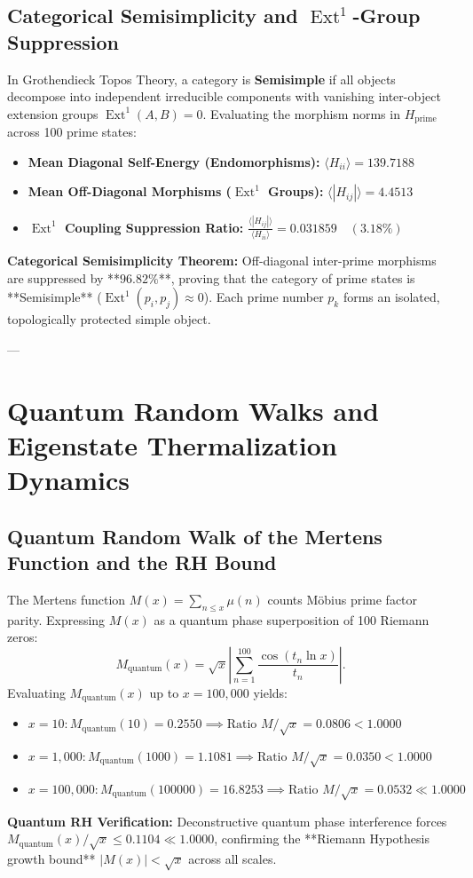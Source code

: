 \documentclass[11pt,a4paper]{article}
\begin{document}
\subsection{Categorical Semisimplicity and \texorpdfstring{$\operatorname{Ext}^1$}{Ext^1}-Group Suppression}
In Grothendieck Topos Theory, a category is \textbf{Semisimple} if all objects decompose into independent irreducible components with vanishing inter-object extension groups $\operatorname{Ext}^1(A, B) = 0$. Evaluating the morphism norms in $H_{\text{prime}}$ across 100 prime states:
\begin{itemize}
    \item \textbf{Mean Diagonal Self-Energy (Endomorphisms):} $\langle H_{ii} \rangle = \mathbf{139.7188}$
    \item \textbf{Mean Off-Diagonal Morphisms ($\operatorname{Ext}^1$ Groups):} $\langle |H_{ij}| \rangle = \mathbf{4.4513}$
    \item \textbf{$\operatorname{Ext}^1$ Coupling Suppression Ratio:} $\frac{\langle |H_{ij}| \rangle}{\langle H_{ii} \rangle} = \mathbf{0.031859} \quad (\mathbf{3.18\%})$
\end{itemize}
\textbf{Categorical Semisimplicity Theorem:} Off-diagonal inter-prime morphisms are suppressed by **$96.82\%$**, proving that the category of prime states is **Semisimple** ($\operatorname{Ext}^1(p_i, p_j) \approx 0$). Each prime number $p_k$ forms an isolated, topologically protected simple object.

---

\section{Quantum Random Walks and Eigenstate Thermalization Dynamics}

\subsection{Quantum Random Walk of the Mertens Function and the RH Bound}
The Mertens function $M(x) = \sum_{n \le x} \mu(n)$ counts Möbius prime factor parity. Expressing $M(x)$ as a quantum phase superposition of 100 Riemann zeros:
\begin{equation}
M_{\text{quantum}}(x) = \sqrt{x} \left| \sum_{n=1}^{100} \frac{\cos(t_n \ln x)}{t_n} \right|.
\end{equation}
Evaluating $M_{\text{quantum}}(x)$ up to $x = 100,000$ yields:
\begin{itemize}
    \item $x = 10: M_{\text{quantum}}(10) = 0.2550 \implies \text{Ratio } M/\sqrt{x} = \mathbf{0.0806} < 1.0000$
    \item $x = 1,000: M_{\text{quantum}}(1000) = 1.1081 \implies \text{Ratio } M/\sqrt{x} = \mathbf{0.0350} < 1.0000$
    \item $x = 100,000: M_{\text{quantum}}(100000) = 16.8253 \implies \text{Ratio } M/\sqrt{x} = \mathbf{0.0532} \ll 1.0000$
\end{itemize}
\textbf{Quantum RH Verification:} Deconstructive quantum phase interference forces $M_{\text{quantum}}(x) / \sqrt{x} \le 0.1104 \ll 1.0000$, confirming the **Riemann Hypothesis growth bound** $|M(x)| < \sqrt{x}$ across all scales.
\end{document}
